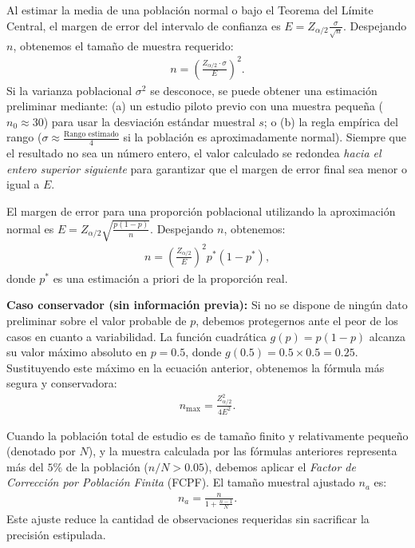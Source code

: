 \begin{teorema}
	Al estimar la media de una población normal o bajo el Teorema del Límite Central, el margen de error del intervalo de confianza es $E = Z_{\alpha/2} \frac{\sigma}{\sqrt{n}}$. Despejando $n$, obtenemos el tamaño de muestra requerido:
	\begin{align}
		n = \left( \frac{Z_{\alpha/2} \cdot \sigma}{E} \right)^2.
		\label{eq:n_media}
	\end{align}
	Si la varianza poblacional $\sigma^2$ se desconoce, se puede obtener una estimación preliminar mediante: (a) un estudio piloto previo con una muestra pequeña ($n_0 \approx 30$) para usar la desviación estándar muestral $s$; o (b) la regla empírica del rango ($\sigma \approx \frac{\text{Rango estimado}}{4}$ si la población es aproximadamente normal). Siempre que el resultado no sea un número entero, el valor calculado se redondea \emph{hacia el entero superior siguiente} para garantizar que el margen de error final sea menor o igual a $E$.
\end{teorema}

\begin{teorema}
	El margen de error para una proporción poblacional utilizando la aproximación normal es $E = Z_{\alpha/2} \sqrt{\frac{p(1-p)}{n}}$. Despejando $n$, obtenemos:
	\begin{align}
		n = \left( \frac{Z_{\alpha/2}}{E} \right)^2 p^* (1 - p^*),
		\label{eq:n_proporcion}
	\end{align}
	donde $p^*$ es una estimación a priori de la proporción real.
	
	\textbf{Caso conservador (sin información previa):} Si no se dispone de ningún dato preliminar sobre el valor probable de $p$, debemos protegernos ante el peor de los casos en cuanto a variabilidad. La función cuadrática $g(p) = p(1-p)$ alcanza su valor máximo absoluto en $p = 0.5$, donde $g(0.5) = 0.5 \times 0.5 = 0.25$. Sustituyendo este máximo en la ecuación anterior, obtenemos la fórmula más segura y conservadora:
	\begin{align}
		n_{\text{max}} = \frac{Z_{\alpha/2}^2}{4 E^2}.
		\label{eq:n_conservador}
	\end{align}
\end{teorema}

\begin{observacion}
	Cuando la población total de estudio es de tamaño finito y relativamente pequeño (denotado por $N$), y la muestra calculada por las fórmulas anteriores representa más del $5\%$ de la población ($n / N > 0.05$), debemos aplicar el \emph{Factor de Corrección por Población Finita} (FCPF). El tamaño muestral ajustado $n_a$ es:
	\begin{align}
		n_a = \frac{n}{1 + \frac{n-1}{N}}.
	\end{align}
	Este ajuste reduce la cantidad de observaciones requeridas sin sacrificar la precisión estipulada.
\end{observacion}
